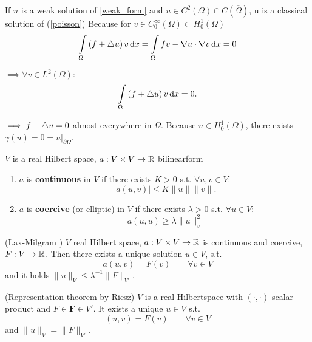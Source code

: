 If $u$ is a weak solution of \eqref{weak_form} and $u \in C^2(\Omega)\cap C(\overline{\Omega})$, u is a classical solution of (\ref{poisson}) Because for $v \in C^\infty_0(\Omega) \subset H^1_0(\Omega)$
\begin{equation*}
	\int \limits_\Omega \left( f + \mathop{}\!\mathbin\bigtriangleup u \right) v \mathop{}\!\mathrm{d} x = \int \limits_\Omega  fv - \nabla u \cdot \nabla v \mathop{}\!\mathrm{d} x = 0
\end{equation*}

$\implies \forall v\in L^2(\Omega):$ 
\begin{equation*}
	\int \limits_\Omega \left( f + \mathop{}\!\mathbin\bigtriangleup u \right) v \mathop{}\!\mathrm{d} x = 0.
\end{equation*}

$\implies f + \mathop{}\!\mathbin\bigtriangleup u = 0$ almost everywhere in $\Omega$.\enter
Because $u \in H^1_0(\Omega)$, there exists $\gamma(u) = 0 = u|_{\partial \Omega}$.

\begin{definition_}
	$V$ is a real Hilbert space, $a: V \times V \to \mathbb{R}$ bilinearform
	\begin{enumerate}[label=(\alph*)]
		\item $a$ is \textbf{continuous} in $V$ if there exists $K > 0$ s.t. $\forall u,v \in V:$ 
		\begin{equation*}
			|a(u,v)| \leq K \|u\| \|v\|.
		\end{equation*} 
		\item $a$ is \textbf{coercive} (or elliptic) in $V$ if there exists $\lambda > 0$ s.t. $\forall u \in V:$
		\begin{equation*}
			a(u,u)  \geq \lambda \|u\|^2_v
		\end{equation*}
	\end{enumerate}
\end{definition_}

\begin{thrm}
	(Lax-Milgram )\enter
	$V$ real Hilbert space, $a: V \times V \to \mathbb{R}$ is continuous and coercive, $F:V \to \mathbb{R}$. Then there exists a unique solution $u \in V$, s.t.
	\begin{equation*}
		a(u,v) = F(v) \qquad \forall v \in V
	\end{equation*}
	and it holds $\|u\|_V \leq \lambda^{-1}\|F\|_{V'}$.
\end{thrm}

\begin{reminder}
	(Representation theorem by Riesz)\enter
	$V$ is a real Hilbertspace with $(\cdot,\cdot)$ scalar product and $F \in \textbf{F} \in V'$. It exists a unique $u \in V$ s.t.
	\begin{equation*}
		(u,v) = F(v) \qquad \forall v\in V
	\end{equation*} 
	and $\|u\|_V = \|F\|_{V'}$.
\end{reminder}


